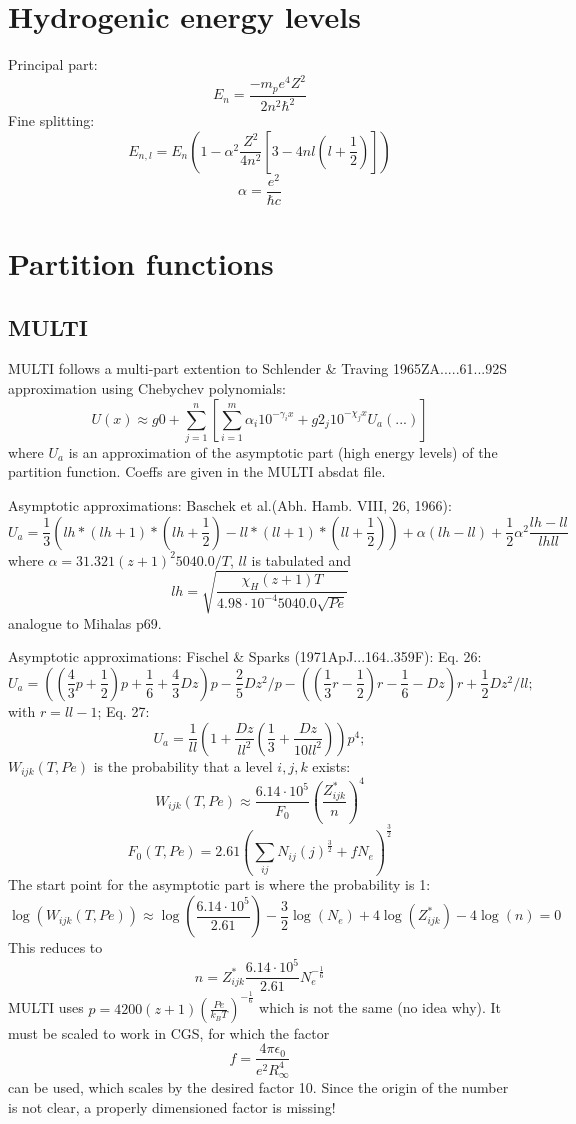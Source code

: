 \documentclass[a4paper]{article}
\begin{document}
\section{Hydrogenic energy levels}
Principal part:
$$
E_n=\frac{-m_p e^4Z^2}{2n^2 \hbar^2}
$$
Fine splitting:
$$
E_{n,l}=E_n(1-\alpha^2\frac{Z^2}{4n^2}[3-4nl(l+\frac{1}{2})])
$$
$$
\alpha=\frac{e^2}{\hbar c}
$$

\section{Partition functions}
\subsection{MULTI}
MULTI follows a multi-part extention to Schlender \& Traving 1965ZA.....61...92S approximation using Chebychev polynomials:
$$
U(x)\approx g0 + \sum_{j=1}^n \left[ \sum_{i=1}^{m} \alpha_i 10^{-\gamma_i x} + g2_j 10^{-\chi_j x} U_a(...)\right]
$$
where $U_a$ is an approximation of the asymptotic part (high energy levels) of the partition function. Coeffs are given in the MULTI absdat file.

Asymptotic approximations: Baschek et al.(Abh. Hamb. VIII, 26, 1966):
$$ U_a=\frac{1}{3}(lh*(lh+1)*(lh+\frac{1}{2})-ll*(ll+1)*(ll+\frac{1}{2}))+\alpha(lh-ll)+\frac{1}{2}\alpha^2\frac{lh-ll}{lh ll}
$$
where $\alpha=31.321(z+1)^2 5040.0/T$, $ll$ is tabulated and 
$$
lh=\sqrt{\frac{\chi_H (z+1)T}{4.98\cdot 10^{-4} 5040.0 \sqrt{Pe}}}
$$
analogue to Mihalas p69.

Asymptotic approximations: Fischel \& Sparks (1971ApJ...164..359F):
Eq. 26:
$$
U_a=((\frac{4}{3}p+\frac{1}{2})p+\frac{1}{6}+\frac{4}{3}Dz)p-\frac{2}{5}Dz^2/p-
    ((\frac{1}{3}r-\frac{1}{2})r-\frac{1}{6}-Dz)r+\frac{1}{2}Dz^2/ll;
$$
with $r=ll-1$; Eq. 27:
$$
U_a=\frac{1}{ll}(1+\frac{Dz}{ll^2}(\frac{1}{3}+\frac{Dz}{10 ll^2}))p^4;
$$
$W_{ijk}(T,Pe)$ is the probability that a level $i,j,k$ exists:
$$
W_{ijk}(T,Pe)\approx \frac{6.14\cdot 10^5}{F_0} \left( \frac{Z^*_{ijk}}{n}\right)^4
$$
$$
F_0(T,Pe)=2.61 \left( \sum_{ij} N_{ij}(j)^\frac{3}{2}+ fN_e \right)^\frac{3}{2}
$$
The start point for the asymptotic part is where the probability is 1:
$$
\log(W_{ijk}(T,Pe))\approx \log(\frac{6.14\cdot 10^5}{2.61}) - \frac{3}{2}\log(N_e) +
4 \log(Z^*_{ijk}) - 4 \log(n) = 0
$$
This reduces to 
$$
n=Z^*_{ijk}\frac{6.14\cdot 10^5}{2.61}N_e^{-\frac{1}{6}}
$$
MULTI uses
$p=4200(z+1)(\frac{Pe}{k_B T})^{-\frac{1}{6}}$ which is not the same (no idea why). It must be scaled 
to work in CGS, for which the factor
$$
f=\frac{4\pi\epsilon_0}{e^2 R_\infty^4}
$$
can be used, which scales by the desired factor 10. Since the origin of the number is not clear, a 
properly dimensioned factor is missing!
\end{document}
